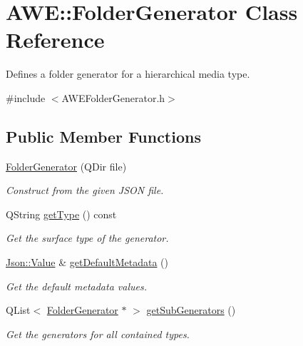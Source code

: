 \hypertarget{class_a_w_e_1_1_folder_generator}{\section{A\-W\-E\-:\-:Folder\-Generator Class Reference}
\label{class_a_w_e_1_1_folder_generator}
}


Defines a folder generator for a hierarchical media type.  




{\ttfamily \#include $<$A\-W\-E\-Folder\-Generator.\-h$>$}

\subsection*{Public Member Functions}
\begin{DoxyCompactItemize}
\item 
\hyperlink{class_a_w_e_1_1_folder_generator_a38b9a994367897fa7865327796308fa3}{Folder\-Generator} (Q\-Dir file)
\begin{DoxyCompactList}\small\item\em Construct from the given J\-S\-O\-N file. \end{DoxyCompactList}\item 
Q\-String \hyperlink{class_a_w_e_1_1_folder_generator_a12560bd36fb5850757d35c64ab174e28}{get\-Type} () const 
\begin{DoxyCompactList}\small\item\em Get the surface type of the generator. \end{DoxyCompactList}\item 
\hyperlink{class_json_1_1_value}{Json\-::\-Value} \& \hyperlink{class_a_w_e_1_1_folder_generator_abb61f607773041805087d78de264fcd1}{get\-Default\-Metadata} ()
\begin{DoxyCompactList}\small\item\em Get the default metadata values. \end{DoxyCompactList}\item 
Q\-List$<$ \hyperlink{class_a_w_e_1_1_folder_generator}{Folder\-Generator} $\ast$ $>$ \hyperlink{class_a_w_e_1_1_folder_generator_a2fcc259b2f405787209a29708fcef548}{get\-Sub\-Generators} ()
\begin{DoxyCompactList}\small\item\em Get the generators for all contained types. \end{DoxyCompactList}\item 

\end{DoxyCompactItemize}
